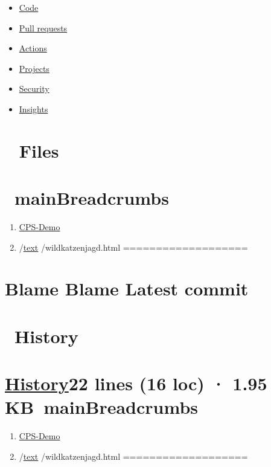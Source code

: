 \documentclass[
  letterpaper,
]{book}
\providecommand{\tightlist}{%
  \setlength{\itemsep}{0pt}\setlength{\parskip}{0pt}}\usepackage{longtable,booktabs,array}
\begin{document}
\begin{itemize}
\item
  \href{./shionkim/CPS-Demo}{Code}
\item
  \href{./shionkim/CPS-Demo/pulls}{Pull requests}
\item
  \href{./shionkim/CPS-Demo/actions}{Actions}
\item
  \href{./shionkim/CPS-Demo/projects}{Projects}
\item
  \href{./shionkim/CPS-Demo/security}{Security}
\item
  \href{./shionkim/CPS-Demo/pulse}{Insights}

  \section{Files}\label{files-1}
\end{itemize}

\section{~mainBreadcrumbs}\label{mainbreadcrumbs-1}

\begin{enumerate}
\def\labelenumi{\arabic{enumi}.}
\tightlist
\item
  \href{./shionkim/CPS-Demo/tree/main}{CPS-Demo}
\item
  /\href{./shionkim/CPS-Demo/tree/main/text}{text} /wildkatzenjagd.html
  ===================
\end{enumerate}

\section{Blame Blame Latest commit}\label{blame-blame-latest-commit-1}

\section{~History}\label{history-1}

\section{\texorpdfstring{\href{./shionkim/CPS-Demo/commits/main/text/wildkatzenjagd.html}{History}22
lines (16 loc) · 1.95
KB~mainBreadcrumbs}{History22 lines (16 loc) · 1.95 KB~mainBreadcrumbs}}\label{history22-lines-16-loc-1.95-kb-mainbreadcrumbs-1}

\begin{enumerate}
\def\labelenumi{\arabic{enumi}.}
\tightlist
\item
  \href{./shionkim/CPS-Demo/tree/main}{CPS-Demo}
\item
  /\href{./shionkim/CPS-Demo/tree/main/text}{text} /wildkatzenjagd.html
  ===================
\end{enumerate}
\end{document}
